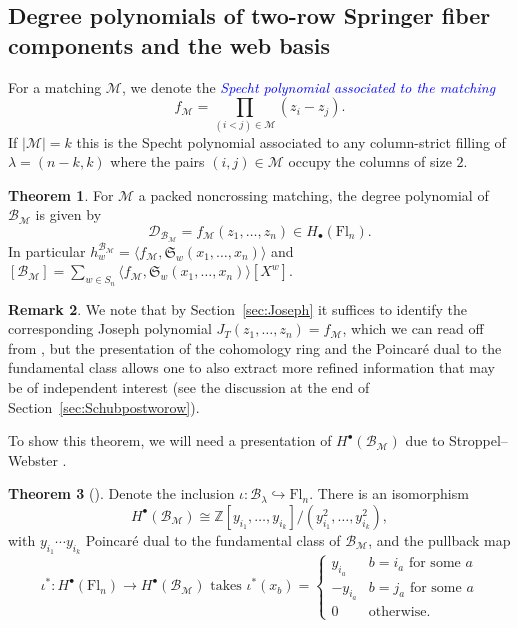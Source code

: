 \documentclass[11pt]{amsart}
\theoremstyle{definition}
\newtheorem{thm}{Theorem}[section]
\newtheorem{rem}[thm]{Remark}
\numberwithin{equation}{section}
\newcommand{\schub}[1]{\mathfrak{S}_{#1}} %
\newcommand{\fl}[1]{\mathrm{Fl}_{#1}}
\renewcommand\emph[1]{\textcolor{blue}{\textit{#1}}} %
\begin{document}
\subsection{Degree polynomials of two-row Springer fiber components and the web basis}
For a matching $\mathcal{M}$, we denote the \emph{Specht polynomial associated to the matching}
\begin{equation}
\label{eqn:fM}f_{\mathcal{M}}=\prod_{(i<j)\in \mathcal{M}}(z_i-z_j).\end{equation}
If $|\mathcal{M}|=k$ this is the Specht polynomial associated to any column-strict filling of $\lambda=(n-k,k)$ where the pairs $(i,j)\in \mathcal{M}$ occupy the columns of size $2$.
\begin{thm}
\label{thm:zizjhomology}
    For $\mathcal{M}$ a packed noncrossing matching, the degree polynomial of $\mathcal{B}_{\mathcal{M}}$ is given by  $$\mathcal{D}_{\mathcal{B}_\mathcal{M}}=f_\mathcal{M}(z_1,\ldots,z_n)\in H_\bullet(\fl{n}).$$
   In particular $h^{\mathcal{B}_\mathcal{M}}_w=\langle f_{\mathcal{M}},\schub{w}(x_1,\ldots,x_n)\rangle$ and
$[\mathcal{B}_\mathcal{M}]=\sum_{w\in S_n}\langle f_\mathcal{M},\schub{w}(x_1,\ldots,x_n)\rangle[X^w].
$
\end{thm}
\begin{rem}
\label{rem:AlternateJoseph}
    We note that by Section~\ref{sec:Joseph} it suffices to identify the corresponding Joseph polynomial $J_T(z_1,\ldots,z_n)=f_{\mathcal{M}}$, which we can read off from \cite[Equation 4.12]{RTVZJ12}, but the presentation of the cohomology ring and the Poincar\'e dual to the fundamental class allows one to also extract more refined information that may be of independent interest (see the discussion at the end of Section~\ref{sec:Schubpostworow}).
\end{rem}
To show this theorem, we will need a presentation of $H^\bullet(\mathcal{B}_\mathcal{M})$ due to Stroppel--Webster \cite{SW12}.
\begin{thm}[{\cite[Theorem 9]{SW12}}]\label{thm:SWpresentation}
    Denote the inclusion  $\iota:\mathcal{B}_\lambda\hookrightarrow \fl{n}$. There is an isomorphism
    $$H^\bullet(\mathcal{B}_\mathcal{M})\cong \mathbb{Z}[y_{i_1},\ldots,y_{i_k}]/(y_{i_1}^2,\ldots,y_{i_k}^2),$$
    with $y_{i_1}\cdots y_{i_k}$ Poincar\'e dual to the fundamental class of $\mathcal{B}_\mathcal{M}$, and the
    pullback map $$\iota^*:H^\bullet(\fl{n})\to H^\bullet(\mathcal{B}_\mathcal{M})\text{ takes }\iota^*(x_b)=\begin{cases}y_{i_a}&b=i_a\text{ for some $a$}\\-y_{i_a}&b=j_a\text{ for some $a$}\\0&\text{otherwise.}\end{cases}$$
\end{thm}
\end{document}
